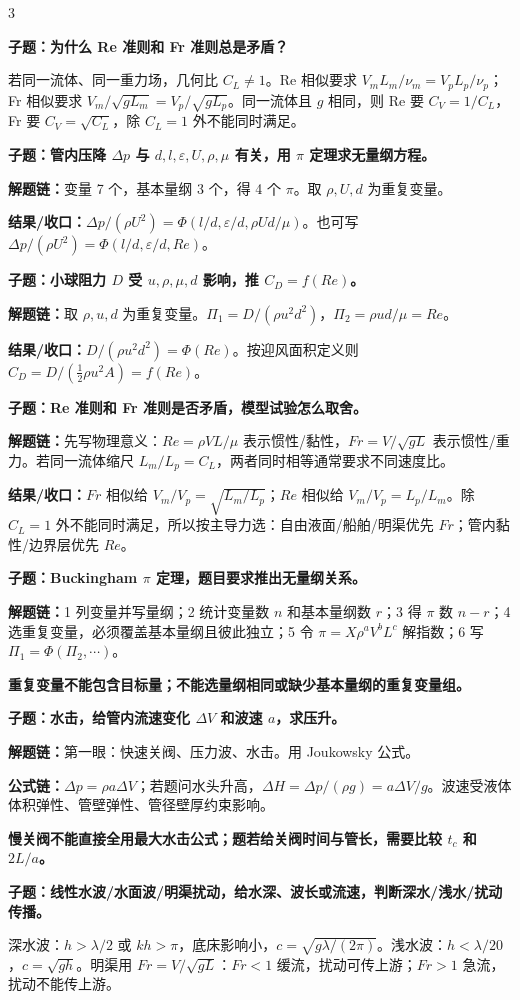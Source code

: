 \documentclass[a4paper]{article}
\newcommand{\qt}[1]{\vspace{0.25pt}\colorbox{Q}{\parbox{\dimexpr\linewidth-2\fboxsep}{\color{white}\bfseries #1}}\par}
\newcommand{\ans}[1]{\colorbox{G}{\parbox{\dimexpr\linewidth-2\fboxsep}{#1}}\par}
\newcommand{\warn}[1]{\colorbox{Y}{\parbox{\dimexpr\linewidth-2\fboxsep}{\color{E}\bfseries #1}}\par}
\newcommand{\chain}[1]{{\color{A}\bfseries 解题链：}#1\par}
\newcommand{\res}[1]{{\color{E}\bfseries 结果/收口：}#1\par}
\newcommand{\form}[1]{{\color{M}\bfseries 公式链：}#1\par}
\begin{document}
\begin{multicols}{3}
\qt{子题：为什么 Re 准则和 Fr 准则总是矛盾？}
\ans{若同一流体、同一重力场，几何比 $C_L\ne1$。Re 相似要求 $V_mL_m/\nu_m=V_pL_p/\nu_p$；Fr 相似要求 $V_m/\sqrt{gL_m}=V_p/\sqrt{gL_p}$。同一流体且 $g$ 相同，则 Re 要 $C_V=1/C_L$，Fr 要 $C_V=\sqrt{C_L}$，除 $C_L=1$ 外不能同时满足。}

\qt{子题：管内压降 $\Delta p$ 与 $d,l,\varepsilon,U,\rho,\mu$ 有关，用 $\pi$ 定理求无量纲方程。}
\chain{变量 7 个，基本量纲 3 个，得 4 个 $\pi$。取 $\rho,U,d$ 为重复变量。}
\res{$\Delta p/(\rho U^2)=\Phi(l/d,\varepsilon/d,\rho Ud/\mu)$。也可写 $\Delta p/(\rho U^2)=\Phi(l/d,\varepsilon/d,Re)$。}

\qt{子题：小球阻力 $D$ 受 $u,\rho,\mu,d$ 影响，推 $C_D=f(Re)$。}
\chain{取 $\rho,u,d$ 为重复变量。$\Pi_1=D/(\rho u^2d^2)$，$\Pi_2=\rho ud/\mu=Re$。}
\res{$D/(\rho u^2d^2)=\Phi(Re)$。按迎风面积定义则 $C_D=D/(\frac12\rho u^2A)=f(Re)$。}

\qt{子题：Re 准则和 Fr 准则是否矛盾，模型试验怎么取舍。}
\chain{先写物理意义：$Re=\rho VL/\mu$ 表示惯性/黏性，$Fr=V/\sqrt{gL}$ 表示惯性/重力。若同一流体缩尺 $L_m/L_p=C_L$，两者同时相等通常要求不同速度比。}
\res{$Fr$ 相似给 $V_m/V_p=\sqrt{L_m/L_p}$；$Re$ 相似给 $V_m/V_p=L_p/L_m$。除 $C_L=1$ 外不能同时满足，所以按主导力选：自由液面/船舶/明渠优先 $Fr$；管内黏性/边界层优先 $Re$。}

\qt{子题：Buckingham $\pi$ 定理，题目要求推出无量纲关系。}
\chain{1 列变量并写量纲；2 统计变量数 $n$ 和基本量纲数 $r$；3 得 $\pi$ 数 $n-r$；4 选重复变量，必须覆盖基本量纲且彼此独立；5 令 $\pi=X\rho^aV^bL^c$ 解指数；6 写 $\Pi_1=\Phi(\Pi_2,\cdots)$。}
\warn{重复变量不能包含目标量；不能选量纲相同或缺少基本量纲的重复变量组。}

\qt{子题：水击，给管内流速变化 $\Delta V$ 和波速 $a$，求压升。}
\chain{第一眼：快速关阀、压力波、水击。用 Joukowsky 公式。}
\form{$\Delta p=\rho a\Delta V$；若题问水头升高，$\Delta H=\Delta p/(\rho g)=a\Delta V/g$。波速受液体体积弹性、管壁弹性、管径壁厚约束影响。}
\warn{慢关阀不能直接全用最大水击公式；题若给关阀时间与管长，需要比较 $t_c$ 和 $2L/a$。}

\qt{子题：线性水波/水面波/明渠扰动，给水深、波长或流速，判断深水/浅水/扰动传播。}
\ans{深水波：$h>\lambda/2$ 或 $kh>\pi$，底床影响小，$c=\sqrt{g\lambda/(2\pi)}$。浅水波：$h<\lambda/20$，$c=\sqrt{gh}$。明渠用 $Fr=V/\sqrt{gL}$：$Fr<1$ 缓流，扰动可传上游；$Fr>1$ 急流，扰动不能传上游。}



\end{multicols}
\end{document}

